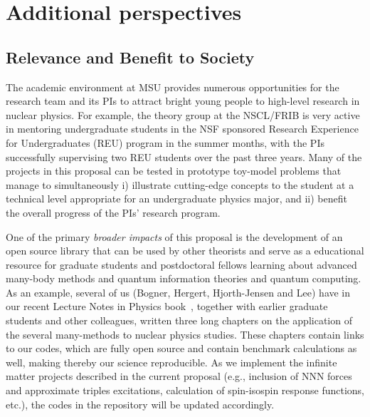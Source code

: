 \documentclass[10pt]{article}
\begin{document}
\section{Additional perspectives}

\subsection{Relevance and Benefit to Society}

The academic environment at MSU provides numerous opportunities for
the research team and its PIs to attract bright young people to high-level research in
nuclear physics. For example, the theory group at the NSCL/FRIB is very
active in mentoring undergraduate students in the NSF sponsored
Research Experience for Undergraduates (REU) program in the summer
months, with the PIs successfully supervising two REU students over
the past three years. Many of the projects in this proposal can be
tested in prototype toy-model problems that manage to simultaneously
i) illustrate cutting-edge concepts to the student at a technical
level appropriate for an undergraduate physics major, and ii) benefit
the overall progress of the PIs' research program.

One of the primary \emph{broader impacts} of this proposal
is the development of an
open source library that can be used by other theorists and serve as a
educational resource for graduate students and postdoctoral fellows learning about
advanced many-body methods and quantum information theories and quantum computing.  As an example, several of us (Bogner, Hergert, Hjorth-Jensen and Lee) have in our recent Lecture
Notes in Physics book~\cite{lnp}, together with earlier graduate
students and other colleagues, written three long chapters on the
application of the several many-methods to nuclear physics studies. These
chapters contain links to our codes, which are fully open source and
contain benchmark calculations as well, making thereby our science
reproducible.  As
we implement the infinite matter projects described in the current
proposal (e.g., inclusion of NNN forces and approximate triples
excitations, calculation of spin-isospin response functions, etc.),
the codes in the repository will be updated accordingly.
\end{document}
